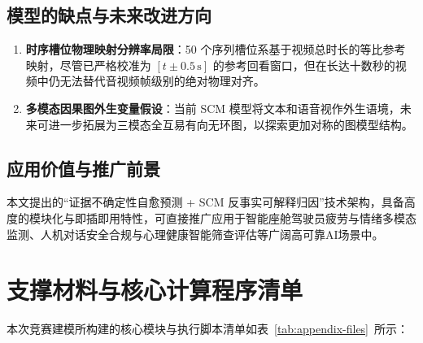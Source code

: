 \documentclass{huawei-mcm}
\begin{document}
\section{模型的缺点与未来改进方向}
\begin{enumerate}[label=\textbf{\arabic*.}]
  \item \textbf{时序槽位物理映射分辨率局限}：50 个序列槽位系基于视频总时长的等比参考映射，尽管已严格校准为 $[t \pm 0.5\,\mathrm{s}]$ 的参考回看窗口，但在长达十数秒的视频中仍无法替代音视频帧级别的绝对物理对齐。
  \item \textbf{多模态因果图外生变量假设}：当前 SCM 模型将文本和语音视作外生语境，未来可进一步拓展为三模态全互易有向无环图，以探索更加对称的图模型结构。
\end{enumerate}

\section{应用价值与推广前景}
本文提出的“证据不确定性自愈预测 + SCM 反事实可解释归因”技术架构，具备高度的模块化与即插即用特性，可直接推广应用于智能座舱驾驶员疲劳与情绪多模态监测、人机对话安全合规与心理健康智能筛查评估等广阔高可靠AI场景中。



\beginappendices

\chapter{支撑材料与核心计算程序清单}
\label{sec:appendix_scripts}

本次竞赛建模所构建的核心模块与执行脚本清单如表~\ref{tab:appendix-files}~所示：
\end{document}
